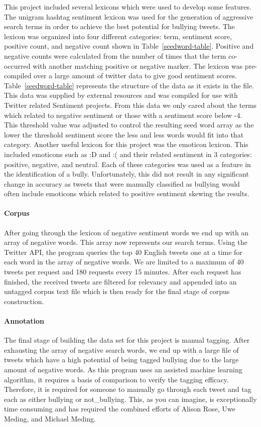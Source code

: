 \documentclass[11pt,letterpaper]{article}
\begin{document}
This project included several lexicons which were used to develop some features. The unigram hashtag sentiment lexicon was used for the generation of aggressive search terms in order to achieve the best potential for bullying tweets. The lexicon was organized into four different categories: term, sentiment score, positive count, and negative count shown in Table~\ref{seedword-table}. Positive and negative counts were calculated from the number of times that the term co-occurred with another matching positive or negative marker. The lexicon was pre-compiled over a large amount of twitter data to give good sentiment scores. Table~\ref{seedword-table} represents the structure of the data as it exists in the file. This data was supplied by external resources and was compiled for use with Twitter related Sentiment projects. From this data we only cared about the terms which related to negative sentiment or those with a sentiment score below -4. This threshold value was adjusted to control the resulting seed word array as the lower the threshold sentiment score the less and less words would fit into that category. 
Another useful lexicon for this project was the emoticon lexicon. This included emoticons such as :D and :( and their related sentiment in 3 categories: positive, negative, and neutral. Each of these categories was used as a feature in the identification of a bully. Unfortunately, this did not result in any significant change in accuracy as tweets that were manually classified as bullying would often include emoticons which related to positive sentiment skewing the results.

\paragraph{Corpus}
After going through the lexicon of negative sentiment words we end up with an array of negative words. This array now represents our search terms. Using the Twitter API, the program queries the top 40 English tweets one at a time for each word in the array of negative words. We are limited to a maximum of 40 tweets per request and 180 requests every 15 minutes. After each request has finished, the received tweets are filtered for relevancy and appended into an untagged corpus text file which is then ready for the final stage of corpus construction.

\paragraph{Annotation}
The final stage of building the data set for this project is manual tagging. After exhausting the array of negative search words, we end up with a large file of tweets which have a high potential of being tagged bullying due to the large amount of negative words. As this program uses an assisted machine learning algorithm, it requires a basis of comparison to verify the tagging efficacy. Therefore, it is required for someone to manually go through each tweet and tag each as either bullying or not\_bullying. This, as you can imagine, is exceptionally time consuming and has required the combined efforts of Alison Rose, Uwe Meding, and Michael Meding.
 
\end{document}
